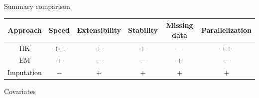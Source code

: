 \documentclass[12pt]{article}
\newcommand{\headsize}{\fontsize{35}{35} \selectfont}
\newcommand{\smallsize}{\fontsize{25}{30} \selectfont}
\newcommand{\smallersize}{\fontsize{20}{25} \selectfont}
\begin{document}
\newpage

\headsize \color{myyellow}
\hfill \begin{minipage}{5.75in}
\centering
Summary comparison
\end{minipage}


\vspace{25mm}

\begin{center}
\color{mywhite}
\smallersize

\renewcommand\arraystretch{2}
\begin{tabular}{cccccc}
\hline
Approach & Speed & Extensibility & Stability & Missing data &
Parallelization \\
\hline
HK & ++ & + & + & -- & ++ \\
EM & + & $-$ & $-$ & + & $-$ \\
Imputation & $-$ & + & + & + & + \\
\hline
\end{tabular}
\end{center}


\newpage

\headsize \color{myyellow}
\hfill \begin{minipage}{5.75in}
\centering
Covariates
\end{minipage}

\vspace{15mm}

\color{mywhite} \smallsize
\end{document}
